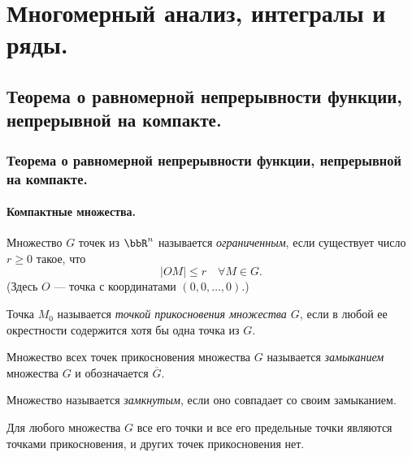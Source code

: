 \part[Многомерный анализ, интегралы и ряды.]{Многомерный анализ, интегралы и ряды.}%
\chapter[Теорема о равномерной непрерывности функции, непрерывной на компакте.]{Теорема о равномерной непрерывности функции, непрерывной на компакте.}

\section{Теорема о равномерной непрерывности функции, непрерывной на компакте.}

\subsection{Компактные множества.}

\begin{defn}
Множество $G$ точек из $\bbR ^n$ называется \textit{ограниченным}, если существует число $r\ge 0$ такое, что
$$
|OM|\le r \quad \forall M\in G.
$$
(Здесь $O$ --- точка с координатами $(0, 0, \ldots , 0).$)
\end{defn}

\begin{defn}
Точка $M_0$ называется \textit{точкой прикосновения множества $G$}, если в любой ее окрестности содержится хотя бы одна точка из $G$.
\end{defn}

\begin{defn}
Множество всех точек прикосновения множества $G$ называется \textit{замыканием} множества $G$ и обозначается $\overline{G}$.
\end{defn}

\begin{defn}
Множество называется \textit{замкнутым}, если оно совпадает со своим замыканием.
\end{defn}

Для любого множества $G$ все его точки и все его предельные точки являются точками прикосновения, и других точек прикосновения нет.

